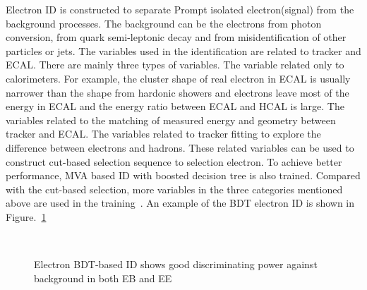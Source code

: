 Electron ID is constructed to separate Prompt isolated electron(signal) from the background processes. The background can be the electrons from photon conversion, from quark semi-leptonic decay and from misidentification of other particles or jets. The variables used in the identification are related to tracker and ECAL.  There are mainly three types of variables. The variable related only to calorimeters. For example, the cluster shape of real electron in ECAL is usually narrower than the shape from hardonic showers and electrons leave most of the energy in ECAL and the energy ratio between ECAL and HCAL is large. The variables related to the matching of measured energy and geometry between tracker and ECAL. The variables related to tracker fitting to explore the difference between electrons and hadrons. These related variables can be used to construct cut-based selection sequence to selection electron. To achieve better performance, MVA based ID with boosted decision tree is also trained. Compared with the cut-based selection, more variables in the three categories mentioned above are used in the training~\cite{electron_reco2015}.  An example of the BDT electron ID is shown in Figure.~\ref{fig:eleBDTID}


\begin{figure}[!htbp] 
     \centering
     \\
     \caption{Electron BDT-based ID shows good discriminating power against background in both EB and EE~\cite{electron_reco2015}}
     \label{fig:eleBDTID}
\end{figure}


